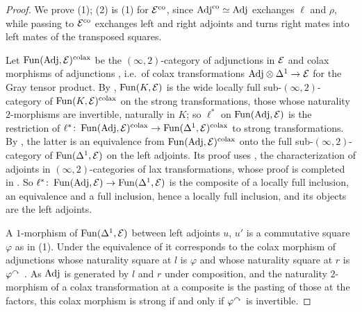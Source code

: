 \begin{proof}
%
We prove (1); (2) is (1) for $\mathcal{E}^{\mathrm{co}}$, since
$\mathrm{Adj}^{\mathrm{co}} \simeq \mathrm{Adj}$
exchanges $\ell$ and $\rho$, while passing to $\mathcal{E}^{\mathrm{co}}$ exchanges left
and right adjoints and turns right mates into left mates of the transposed
squares.

Let
$\operatorname{Fun}(\mathrm{Adj},\mathcal{E})^{\mathrm{colax}}$
be the $(\infty,2)$-category of adjunctions in $\mathcal{E}$ and colax morphisms of
adjunctions \cite[Def.~4.2]{haugseng2021laxmonads},
i.e.\ of colax transformations
$\mathrm{Adj} \otimes \Delta^{1} \to \mathcal{E}$
for the Gray tensor product.
By \cite[Cor.~2.8.12]{abellangagnahaugseng2024straightening},
$\operatorname{Fun}(K,\mathcal{E})$ is the wide locally full sub-$(\infty,2)$-category of
$\operatorname{Fun}(K,\mathcal{E})^{\mathrm{colax}}$
on the strong transformations, those whose naturality $2$-morphisms are
invertible, naturally in $K$; so $\ell^{*}$ on $\operatorname{Fun}(\mathrm{Adj},\mathcal{E})$ is the
restriction of
$\ell^{*}\colon \operatorname{Fun}(\mathrm{Adj},\mathcal{E})^{\mathrm{colax}} \to
\operatorname{Fun}(\Delta^{1},\mathcal{E})^{\mathrm{colax}}$
to strong transformations.
By \cite[Cor.~4.8]{haugseng2021laxmonads}, the latter is an equivalence from
$\operatorname{Fun}(\mathrm{Adj},\mathcal{E})^{\mathrm{colax}}$
onto the full sub-$(\infty,2)$-category of $\operatorname{Fun}(\Delta^{1},\mathcal{E})$ on the left
adjoints. Its proof uses \cite[Thm.~4.6]{haugseng2021laxmonads},
the characterization of adjoints in $(\infty,2)$-categories of lax
transformations, whose proof is completed in \cite[Cor.~5.2.10,
Rem.~5.2.11]{abellangagnahaugseng2024straightening}.
So
$\ell^{*}\colon \operatorname{Fun}(\mathrm{Adj},\mathcal{E}) \to \operatorname{Fun}(\Delta^{1},\mathcal{E})$
is the composite of a locally full inclusion,
an equivalence and a full inclusion, hence a locally full inclusion,
and its objects are the left adjoints.

A $1$-morphism of $\operatorname{Fun}(\Delta^{1},\mathcal{E})$ between left adjoints $u$,
$u'$ is a commutative square $\varphi$ as in (1).
Under the equivalence of \cite[Cor.~4.8]{haugseng2021laxmonads} it corresponds
to the colax morphism of adjunctions whose naturality square at $l$ is $\varphi$
and whose naturality square at $r$ is ${\varphi}^{\curvearrowright}$
\cite[Cor.~4.9]{haugseng2021laxmonads}. As $\mathrm{Adj}$ is generated by $l$ and $r$
under composition, and the naturality $2$-morphism of a colax transformation at
a composite is the pasting of those at the factors,
this colax morphism is strong if and only if ${\varphi}^{\curvearrowright}$ is invertible.
\end{proof}

